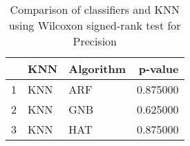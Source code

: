 \begin{table}
\footnotesize
\caption{Comparison of classifiers and KNN using Wilcoxon signed-rank test for Precision}
\label{tab:KNN wilcoxon Precision comparison}
\begin{tabular}{lllr}
\hline
 & KNN & Algorithm & p-value \\
\hline
1 & KNN & ARF & 0.875000 \\
2 & KNN & GNB & 0.625000 \\
3 & KNN & HAT & 0.875000 \\
\hline
\end{tabular}
\end{table}
